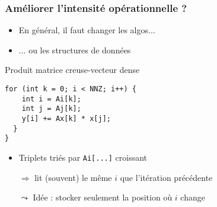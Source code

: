 \documentclass[xcolor={x11names,svgnames}]{beamer}
\begin{document}
\begin{frame}[fragile]
  \frametitle{Améliorer l'intensité opérationnelle ?}

  \begin{itemize}
  \item En général, il faut changer les algos...
  \item ... ou les structures de données
  \end{itemize}

  \bigskip

  \begin{block}{Produit matrice creuse-vecteur dense}
\begin{verbatim}
for (int k = 0; i < NNZ; i++) {
    int i = Ai[k];
    int j = Aj[k];
    y[i] += Ax[k] * x[j];
  }
}
\end{verbatim}
\begin{itemize}
\item Triplets triés par \texttt{Ai[...]} croissant 
\item[$\Rightarrow$] lit (souvent) le même $i$ que l'itération précédente 

  \pause

\item[$\leadsto$] \alert{Idée} : stocker seulement la position où $i$ change
\end{itemize}
\end{block}
\end{frame}

\end{document}
